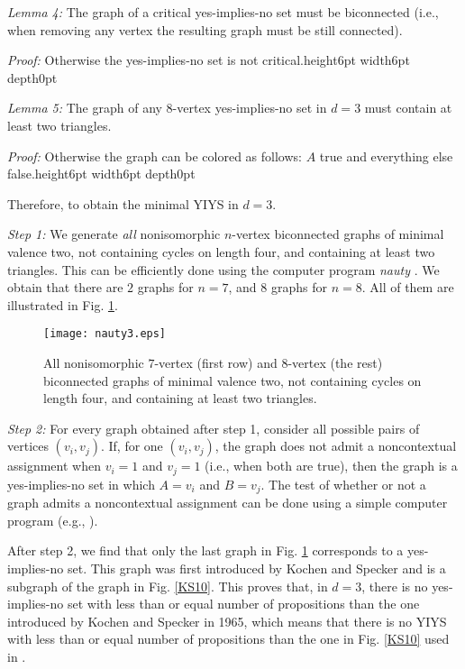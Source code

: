 \documentclass[twocolumn,aps,pra,showpacs]{revtex4-1}
\def\endproof{\vrule height6pt width6pt depth0pt}
\begin{document}
{\em Lemma 4: }The graph of a critical yes-implies-no set must
be biconnected (i.e., when removing any vertex the resulting
graph must be still connected).

{\em Proof: }Otherwise the yes-implies-no set is not
critical.\hfill\endproof

{\em Lemma 5: }The graph of any 8-vertex yes-implies-no set in
$d=3$ must contain at least two triangles.

{\em Proof: }Otherwise the graph can be colored as follows: $A$
true and everything else false.\hfill\endproof

Therefore, to obtain the minimal YIYS in $d=3$.

{\em Step 1: }We generate {\em all} nonisomorphic $n$-vertex
biconnected graphs of minimal valence two, not containing
cycles on length four, and containing at least two triangles.
This can be efficiently done using the computer program {\em
nauty} \cite{McKay07}. We obtain that there are $2$ graphs for
$n=7$, and $8$ graphs for $n=8$. All of them are illustrated in
Fig. \ref{nauty3}.


\begin{figure}
\centerline{\texttt{[image: nauty3.eps]}}
\caption{\label{nauty3}
All nonisomorphic $7$-vertex (first row) and $8$-vertex (the rest)
biconnected graphs of minimal valence two, not containing
cycles on length four, and containing at least two triangles.}
\end{figure}


{\em Step 2: }For every graph obtained after step 1, consider
all possible pairs of vertices $(v_i,v_j)$. If, for one
$(v_i,v_j)$, the graph does not admit a noncontextual
assignment when $v_i=1$ and $v_j=1$ (i.e., when both are true),
then the graph is a yes-implies-no set in which $A=v_i$ and
$B=v_j$. The test of whether or not a graph admits a
noncontextual assignment can be done using a simple computer
program (e.g., \cite{Peres93}).

After step 2, we find that only the last graph in Fig.
\ref{nauty3} corresponds to a yes-implies-no set. This graph
was first introduced by Kochen and Specker \cite{KS65} and is a
subgraph of the graph in Fig. \ref{KS10}. This proves that, in
$d=3$, there is no yes-implies-no set with less than or equal
number of propositions than the one introduced by Kochen and
Specker in 1965, which means that there is no YIYS with less
than or equal number of propositions than the one in Fig.
\ref{KS10} used in \cite{KS67}.
\end{document}
